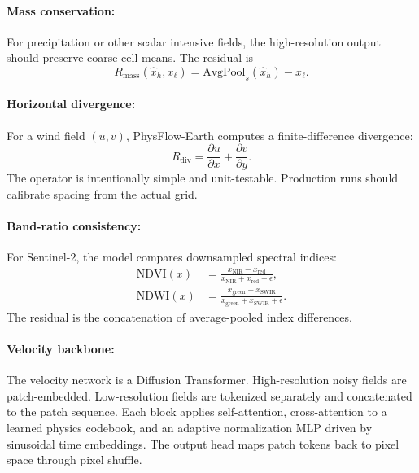 \documentclass{article}
\begin{document}
\paragraph{Mass conservation:}
For precipitation or other scalar intensive fields, the high-resolution output should preserve coarse cell means. The residual is
\begin{equation}
  R_{\text{mass}}(\hat{x}_h,x_{\ell}) =
  \text{AvgPool}_{s}(\hat{x}_h)-x_{\ell}.
\end{equation}

\paragraph{Horizontal divergence:}
For a wind field $(u,v)$, PhysFlow-Earth computes a finite-difference divergence:
\begin{equation}
  R_{\text{div}} = \frac{\partial u}{\partial x}+\frac{\partial v}{\partial y}.
\end{equation}
The operator is intentionally simple and unit-testable. Production runs should calibrate spacing from the actual grid.

\paragraph{Band-ratio consistency:}
For Sentinel-2, the model compares downsampled spectral indices:
\begin{equation}
\begin{aligned}
\text{NDVI}(x)&=\frac{x_{\text{NIR}}-x_{\text{red}}}{x_{\text{NIR}}+x_{\text{red}}+\epsilon},\\
\text{NDWI}(x)&=\frac{x_{\text{green}}-x_{\text{SWIR}}}{x_{\text{green}}+x_{\text{SWIR}}+\epsilon}.
\end{aligned}
\end{equation}
The residual is the concatenation of average-pooled index differences.

\paragraph{Velocity backbone:}

The velocity network is a Diffusion Transformer. High-resolution noisy fields are patch-embedded. Low-resolution fields are tokenized separately and concatenated to the patch sequence. Each block applies self-attention, cross-attention to a learned physics codebook, and an adaptive normalization MLP driven by sinusoidal time embeddings. The output head maps patch tokens back to pixel space through pixel shuffle.
\end{document}
